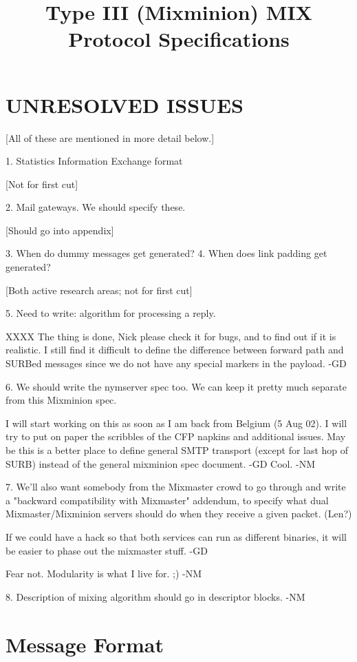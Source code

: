\title{Type III (Mixminion) MIX Protocol Specifications}

\section{UNRESOLVED ISSUES}

[All of these are mentioned in more detail below.]

1. Statistics Information Exchange format

   [Not for first cut]
 
2. Mail gateways. We should specify these.

   [Should go into appendix]
     
3. When do dummy messages get generated?
4. When does link padding get generated?

   [Both active research areas; not for first cut]

5. Need to write: algorithm for processing a reply.

   XXXX The thing is done, Nick please check it for bugs, and to find
   out if it is realistic. I still find it difficult to define the
   difference between forward path and SURBed messages since we do not
   have any special markers in the payload. -GD

6. We should write the nymserver spec too. We can keep it pretty much
    separate from this Mixminion spec.

    I will start working on this as soon as I am back from Belgium (5
    Aug 02). I will try to put on paper the scribbles of the CFP
    napkins and additional issues. May be this is a better place to
    define general SMTP transport (except for last hop of SURB)
    instead of the general mixminion spec document. -GD
    Cool. -NM    

7. We'll also want somebody from the Mixmaster crowd to go through and
    write a "backward compatibility with Mixmaster" addendum, to specify
    what dual Mixmaster/Mixminion servers should do when they receive a
    given packet. (Len?)

    If we could have a hack so that both services can run as different
    binaries, it will be easier to phase out the mixmaster stuff. -GD

    Fear not.  Modularity is what I live for. ;) -NM

8. Description of mixing algorithm should go in descriptor blocks. -NM

\section{Message Format}

